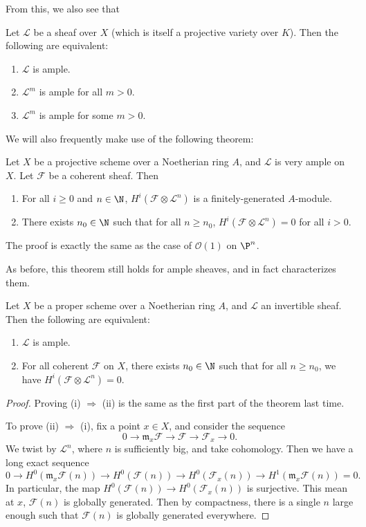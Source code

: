 \documentclass[a4paper]{article}
\begin{document}
From this, we also see that
\begin{prop}
  Let $\mathcal{L}$ be a sheaf over $X$ (which is itself a projective variety over $K$). Then the following are equivalent:
  \begin{enumerate}
    \item $\mathcal{L}$ is ample.
    \item $\mathcal{L}^m$ is ample for all $m > 0$.
    \item $\mathcal{L}^m$ is ample for some $m > 0$.\fakeqed
  \end{enumerate}
\end{prop}

We will also frequently make use of the following theorem:
\begin{thm}[Serre]
  Let $X$ be a projective scheme over a Noetherian ring $A$, and $\mathcal{L}$ is very ample on $X$. Let $\mathcal{F}$ be a coherent sheaf. Then
  \begin{enumerate}
    \item For all $i \geq 0$ and $n \in \N$, $H^i(\mathcal{F} \otimes \mathcal{L}^n)$ is a finitely-generated $A$-module.
    \item There exists $n_0 \in \N$ such that for all $n \geq n_0$, $H^i(\mathcal{F} \otimes \mathcal{L}^n) = 0$ for all $i > 0$.\fakeqed
  \end{enumerate}
\end{thm}
The proof is exactly the same as the case of $\mathcal{O}(1)$ on $\P^n$.

As before, this theorem still holds for ample sheaves, and in fact characterizes them.
\begin{thm}
  Let $X$ be a proper scheme over a Noetherian ring $A$, and $\mathcal{L}$ an invertible sheaf. Then the following are equivalent:
  \begin{enumerate}
    \item $\mathcal{L}$ is ample.
    \item For all coherent $\mathcal{F}$ on $X$, there exists $n_0 \in \N$ such that for all $n \geq n_0$, we have $H^i(\mathcal{F} \otimes \mathcal{L}^n) = 0$.
  \end{enumerate}
\end{thm}

\begin{proof}
  Proving (i) $\Rightarrow$ (ii) is the same as the first part of the theorem last time.

  To prove (ii) $\Rightarrow$ (i), fix a point $x \in X$, and consider the sequence
  \[
    0 \to \mathfrak{m}_x \mathcal{F} \to \mathcal{F} \to \mathcal{F}_x \to 0.
  \]
  We twist by $\mathcal{L}^n$, where $n$ is sufficiently big, and take cohomology. Then we have a long exact sequence
  \[
    0 \to H^0(\mathfrak{m}_x \mathcal{F}(n)) \to H^0(\mathcal{F}(n)) \to H^0(\mathcal{F}_x(n)) \to H^1(\mathfrak{m}_x \mathcal{F}(n)) = 0.
  \]
  In particular, the map $H^0(\mathcal{F}(n)) \to H^0(\mathcal{F}_x(n))$ is surjective. This mean at $x$, $\mathcal{F}(n)$ is globally generated. Then by compactness, there is a single $n$ large enough such that $\mathcal{F}(n)$ is globally generated everywhere.
\end{proof}
\end{document}
